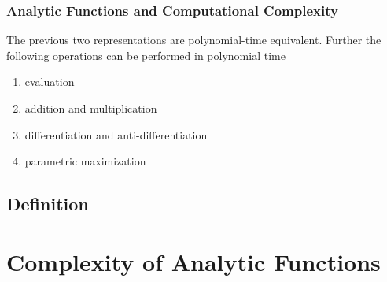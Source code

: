 \documentclass[xcolor=pdftex,dvipsnames,table]{beamer}
\begin{document}
\begin{frame}[<+->]
\frametitle{Analytic Functions and Computational Complexity}
\begin{theorem}
  The previous two representations are polynomial-time equivalent.
  Further the following operations can be performed in polynomial time
\begin{enumerate}
\item evaluation
\item addition and multiplication
\item differentiation and anti-differentiation
\item parametric maximization
\end{enumerate}
\end{theorem}
\end{frame}
\subsection{Definition}
\section{Complexity of Analytic Functions}
\end{document}
